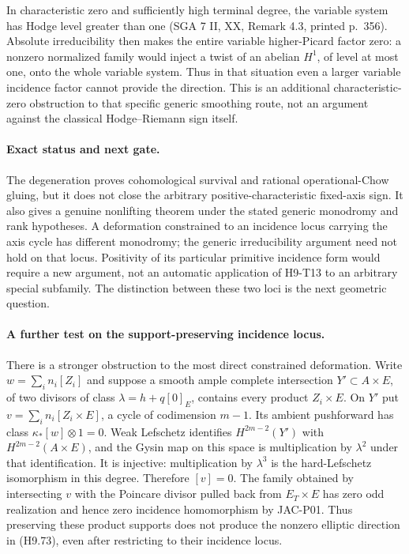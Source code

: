 In characteristic zero and sufficiently high terminal degree, the
variable system has Hodge level greater than one (SGA 7 II, XX,
Remark 4.3, printed p.~356). Absolute irreducibility then makes
the entire variable higher-Picard factor zero: a nonzero normalized
family would inject a twist of an abelian $H^1$, of level at most
one, onto the whole variable system. Thus in that situation even
a larger variable incidence factor cannot provide the direction.
This is an additional characteristic-zero obstruction to that
specific generic smoothing route, not an argument against the
classical Hodge--Riemann sign itself.

\paragraph{Exact status and next gate.}
The degeneration proves cohomological survival and rational
operational-Chow gluing, but it does not close the arbitrary
positive-characteristic fixed-axis sign. It also gives a genuine
nonlifting theorem under the stated generic monodromy and rank
hypotheses. A deformation constrained to an incidence locus
carrying the axis cycle has different monodromy; the generic
irreducibility argument need not hold on that locus. Positivity
of its particular primitive incidence form would require a new
argument, not an automatic application of H9-T13 to an arbitrary
special subfamily. The distinction between these two loci is the
next geometric question.

\paragraph{A further test on the support-preserving incidence locus.}
There is a stronger obstruction to the most direct constrained
deformation. Write $w=\sum_i n_i[Z_i]$ and suppose a smooth ample
complete intersection $Y'\subset A\times E$, of two divisors
of class $\lambda=h+q[0]_E$, contains every product $Z_i\times E$.
On $Y'$ put $v=\sum_i n_i[Z_i\times E]$, a cycle of codimension
$m-1$. Its ambient pushforward has class
$\kappa_*[w]\otimes1=0$. Weak Lefschetz identifies
$H^{2m-2}(Y')$ with $H^{2m-2}(A\times E)$, and the Gysin map
on this space is multiplication by $\lambda^2$ under that
identification. It is injective: multiplication by $\lambda^3$
is the hard-Lefschetz isomorphism in this degree. Therefore
$[v]=0$. The family obtained by intersecting $v$ with the
Poincare divisor pulled back from $E_T\times E$ has zero odd
realization and hence zero incidence homomorphism by JAC-P01.
Thus preserving these product supports does not produce the
nonzero elliptic direction in (H9.73), even after restricting to
their incidence locus.

